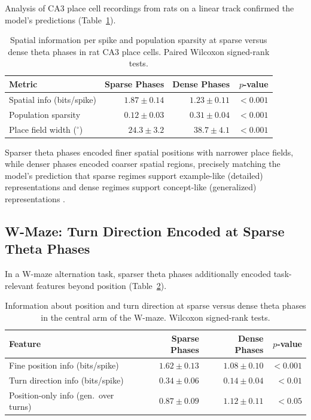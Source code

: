 \documentclass[11pt]{article}
\begin{document}
Analysis of CA3 place cell recordings from rats on a linear track confirmed the model's predictions (Table~\ref{tab:placecells}).

\begin{table}[H]
\centering
\caption{Spatial information per spike and population sparsity at sparse versus dense theta phases in rat CA3 place cells. Paired Wilcoxon signed-rank tests.}
\label{tab:placecells}
\begin{tabular}{lrrr}
\toprule
\textbf{Metric} & \textbf{Sparse Phases} & \textbf{Dense Phases} & \textbf{$p$-value} \\
\midrule
Spatial info (bits/spike) & $1.87 \pm 0.14$ & $1.23 \pm 0.11$ & $<0.001$ \\
Population sparsity & $0.12 \pm 0.03$ & $0.31 \pm 0.04$ & $<0.001$ \\
Place field width ($^\circ$) & $24.3 \pm 3.2$ & $38.7 \pm 4.1$ & $<0.001$ \\
\bottomrule
\end{tabular}
\end{table}

Sparser theta phases encoded finer spatial positions with narrower place fields, while denser phases encoded coarser spatial regions, precisely matching the model's prediction that sparse regimes support example-like (detailed) representations and dense regimes support concept-like (generalized) representations \citep{skaggs1993information}.

\subsection{W-Maze: Turn Direction Encoded at Sparse Theta Phases}

In a W-maze alternation task, sparser theta phases additionally encoded task-relevant features beyond position (Table~\ref{tab:wmaze}).

\begin{table}[H]
\centering
\caption{Information about position and turn direction at sparse versus dense theta phases in the central arm of the W-maze. Wilcoxon signed-rank tests.}
\label{tab:wmaze}
\begin{tabular}{lrrr}
\toprule
\textbf{Feature} & \textbf{Sparse Phases} & \textbf{Dense Phases} & \textbf{$p$-value} \\
\midrule
Fine position info (bits/spike) & $1.62 \pm 0.13$ & $1.08 \pm 0.10$ & $<0.001$ \\
Turn direction info (bits/spike) & $0.34 \pm 0.06$ & $0.14 \pm 0.04$ & $<0.01$ \\
Position-only info (gen.\ over turns) & $0.87 \pm 0.09$ & $1.12 \pm 0.11$ & $<0.05$ \\
\bottomrule
\end{tabular}
\end{table}
\end{document}
